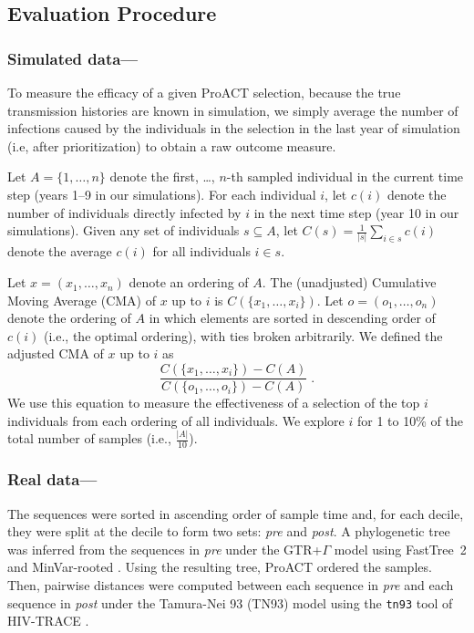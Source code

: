 \documentclass[oupdraft]{sysbio}
\begin{document}
\subsection{Evaluation Procedure}

\subsubsection{Simulated data---}
To measure the efficacy of a given ProACT selection,
because the true transmission histories are known in simulation,
we simply average the number of infections caused by the individuals in the selection in the last year of simulation (i.e, after prioritization)
to obtain a raw outcome measure.

Let $A=\{1,\ldots,n\}$ denote the first, \ldots, $n$-th sampled individual in the current time step (years 1--9 in our simulations). For each individual $i$, let $c(i)$ denote the number of individuals directly infected by $i$ in the next time step (year 10 in our simulations). 
Given any set of individuals $s\subseteq A$, let $C(s)=\frac{1}{|s|}\sum_{i\in s}{c(i)}$ denote the average $c(i)$ for all individuals $i\in s$.

Let $x=(x_1,\ldots,x_n)$ denote an ordering of $A$. The (unadjusted) Cumulative Moving Average (CMA) of $x$ up to $i$ is $C\left(\{x_1,\ldots,x_i\}\right)$.
Let $o=(o_1,\ldots,o_n)$ denote the ordering of $A$ in which elements are sorted in descending order of $c(i)$ (i.e., the optimal ordering), with ties broken arbitrarily. 
We defined the adjusted CMA of $x$ up to $i$ as
\begin{equation*}%
    \frac{C\left(\{x_1,\ldots,x_i\}\right)-C(A)}{C\left(\{o_1,\ldots,o_i\}\right)-C(A)}\; .
\end{equation*}
We use this equation to measure the effectiveness of a selection of the top $i$ individuals from each ordering of all individuals.
We explore $i$ for 1 to 10\% of the total number of samples (i.e., $\frac{|A|}{10}$). 

\subsubsection{Real data---}
The sequences were sorted in ascending order of sample time and,
for each decile,
they were split at the decile to form two sets: \textit{pre} and \textit{post}. A phylogenetic tree was inferred from the sequences in \textit{pre} under the GTR+$\Gamma$ model using FastTree~2 \cite{Price2010} and MinVar-rooted \cite{Mai2017}.
Using the resulting tree, ProACT ordered the samples. 
Then, pairwise distances were computed between each sequence in \textit{pre} and each sequence in \textit{post} under the Tamura-Nei 93 (TN93) model \cite{Tamura1993} using the \texttt{tn93} tool of HIV-TRACE \cite{Pond2018}.
\end{document}
